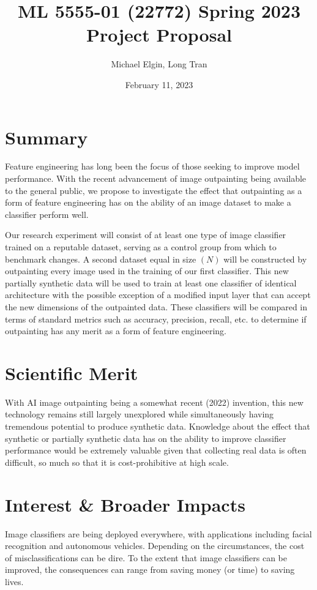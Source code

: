 \documentclass[12pt, letterpaper]{article}
\title{ML 5555-01 (22772) Spring 2023 Project Proposal}
\author{Michael Elgin, Long Tran}
\date{February 11, 2023}
\begin{document}
\maketitle
\newpage

\section{Summary}

Feature engineering has long been the focus of those seeking to improve model performance. With the recent advancement of image outpainting being available to the general public, we propose to investigate the effect that outpainting as a form of feature engineering has on the ability of an image dataset to make a classifier perform well.

Our research experiment will consist of at least one type of image classifier trained on a reputable dataset, serving as a control group from which to benchmark changes. A second dataset equal in size $(N)$ will be constructed by outpainting every image used in the training of our first classifier. This new partially synthetic data will be used to train at least one classifier of identical architecture with the possible exception of a modified input layer that can accept the new dimensions of the outpainted data. These classifiers will be compared in terms of standard metrics such as accuracy, precision, recall, etc. to determine if outpainting has any merit as a form of feature engineering.

\section{Scientific Merit}

With AI image outpainting being a somewhat recent (2022) invention, this new technology remains still largely unexplored while simultaneously having tremendous potential to produce synthetic data. Knowledge about the effect that synthetic or partially synthetic data has on the ability to improve classifier performance would be extremely valuable given that collecting real data is often difficult, so much so that it is cost-prohibitive at high scale.

\section{Interest \& Broader Impacts}

Image classifiers are being deployed everywhere, with applications including facial recognition and autonomous vehicles. Depending on the circumstances, the cost of misclassifications can be dire. To the extent that image classifiers can be improved, the consequences can range from saving money (or time) to saving lives.
\end{document}

